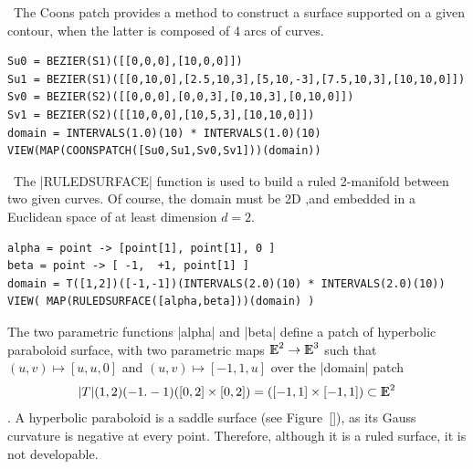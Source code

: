 \begin{coding}[Algebraic computation of FE = $\delta_1$]
\begin{condition}\
The Coons patch provides a method to construct a surface supported on a given contour, when the latter is composed of 4 arcs of curves.
\begin{lstlisting}[language=JuliaLocal, style=julia, mathescape=true]
Su0 = BEZIER(S1)([[0,0,0],[10,0,0]])
Su1 = BEZIER(S1)([[0,10,0],[2.5,10,3],[5,10,-3],[7.5,10,3],[10,10,0]])
Sv0 = BEZIER(S2)([[0,0,0],[0,0,3],[0,10,3],[0,10,0]])
Sv1 = BEZIER(S2)([[10,0,0],[10,5,3],[10,10,0]])
domain = INTERVALS(1.0)(10) * INTERVALS(1.0)(10)
VIEW(MAP(COONSPATCH([Su0,Su1,Sv0,Sv1]))(domain))
\end{lstlisting}
\end{condition}

\begin{condition}[Ruled surface]\
The |RULEDSURFACE| function is used to build a ruled 2-manifold between two given curves. Of course, the domain must be 2D ,and embedded in a Euclidean space of at least dimension $d=2$.
\begin{lstlisting}[language=JuliaLocal, style=julia, mathescape=true]
alpha = point -> [point[1], point[1], 0 ]
beta = point -> [ -1,  +1, point[1] ]
domain = T([1,2])([-1,-1])(INTERVALS(2.0)(10) * INTERVALS(2.0)(10))
VIEW( MAP(RULEDSURFACE([alpha,beta]))(domain) )
\end{lstlisting}
The two parametric functions |alpha| and |beta| define a patch  of hyperbolic paraboloid surface, with two parametric maps $\mathbb{I\!\!E}^2\to\mathbb{I\!\!E}^3$ such that $(u,v)\mapsto[u,u,0]$ and $(u,v)\mapsto[-1,1,u]$ over the |domain| patch $$|T|(1,2)(-1.-1)([0,2]\times[0,2])=([-1,1]\times[-1,1])\subset\mathbb{I\!\!E}^2$$.
A hyperbolic paraboloid is a saddle surface (see Figure~\ref{}), as its Gauss curvature is negative at every point. Therefore, although it is a ruled surface, it is not developable. 
\end{condition}


\end{coding}

